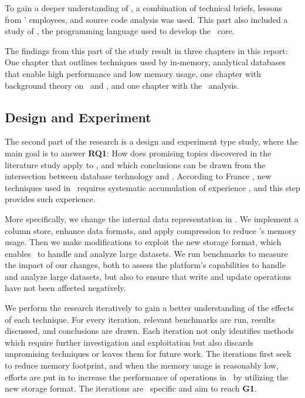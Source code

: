 To gain a deeper understanding of \gap, a combination of technical briefs, lessons from \genus' employees, and source code analysis was used.  This part also included a study of \delphi, the programming language used to develop the \gap~core.

The findings from this part of the study result in three chapters in this report: One chapter that outlines techniques used by in-memory, analytical databases that enable high performance and low memory usage, one chapter with background theory on \mde~and \delphi, and one chapter with the \gap~analysis.

\subsection{Design and Experiment}
\label{sub:Design and Experiment}
The second part of the research is a design and experiment type study, where the main goal is to answer \textbf{RQ1}: How does promising topics discovered in the literature study apply to \gap, and which conclusions can be drawn from the intersection between database technology and \mde. According to France \ea, new techniques used in \mde~requires systematic accumulation of experience \cite{France2007-ae}, and this step provides such experience.

More specifically, we change the internal data representation in \gap. We implement a column store, enhance data formats, and apply compression to reduce \gap's memory usage. Then we make modifications to exploit the new storage format, which enables \gap~to handle and analyze large datasets. We run benchmarks to measure the impact of our changes, both to assess the platform's capabilities to handle and analyze large datasets, but also to ensure that write and update operations have not been affected negatively. 

We perform the research iteratively to gain a better understanding of the effects of each technique. For every iteration, relevant benchmarks are run, results discussed, and conclusions are drawn. Each iteration not only identifies methods which require further investigation and exploitation but also discards unpromising techniques or leaves them for future work. The iterations first seek to reduce memory footprint, and when the memory usage is reasonably low, efforts are put in to increase the performance of operations in \gap~by utilizing the new storage format. The iterations are \gap~specific and aim to reach \textbf{G1}. 

